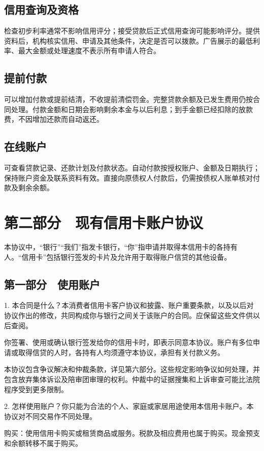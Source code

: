 \documentclass[UTF8,fontset=none,11pt,a4paper]{ctexart}
\begin{document}
\subsection*{信用查询及资格}
检查初步利率通常不影响信用评分；接受贷款后正式信用查询可能影响评分。提供资料后，机构核实信用、申请及其他条件，决定是否可以拨款。广告展示的最低利率、最大金额或处理速度不表示所有申请人符合。


\subsection*{提前付款}
可以增加付款或提前结清，不收提前清偿罚金。完整贷款余额及已发生费用仍按合同处理。付款金额和日期会影响剩余本金与以后利息；到手金额已经扣除的放款费，不因增加还款而自动返还。


\subsection*{在线账户}
可查看贷款记录、还款计划及付款状态。自动付款按授权账户、金额及日期执行；保持账户资金及联系资料有效。直接向原债权人付款后，仍需按债权人账单核对付款及剩余余额。


\section*{第二部分　现有信用卡账户协议}
本协议中，“银行”“我们”指发卡银行，“你”指申请并取得本信用卡的各持有人。“信用卡”包括银行签发的卡片及允许用于取得账户信贷的其他设备。


\subsection*{第一部分　使用账户}
1. 本合同是什么？本消费者信用卡客户协议和披露、账户重要条款，以及以后对协议作出的修改，共同构成你与银行之间关于该账户的合同。应保留这些文件供以后查阅。


你签署、使用或确认银行签发给你的信用卡时，即表示同意本协议。账户有多位申请或取得信贷的人时，各持有人均须遵守本协议，承担有关付款义务。


本协议包含争议解决和仲裁条款，详见第六部分。这些规定影响争议如何处理，并包含放弃集体诉讼及陪审团审理的权利。仲裁中的证据搜集和上诉审查可能比法院程序受到更多限制。


2. 怎样使用账户？你只能为合法的个人、家庭或家居用途使用本信用卡账户。本协议对不同交易作不同处理。


购买：使用信用卡购买或租赁商品或服务。税款及相应费用也属于购买。现金预支和余额转移不属于购买。
\end{document}
